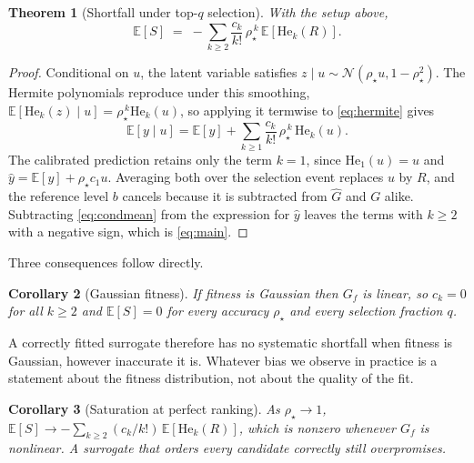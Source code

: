 \documentclass{article}
\theoremstyle{plain}
\newtheorem{theorem}{Theorem}[section]
\newtheorem{corollary}[theorem]{Corollary}
\theoremstyle{definition}
\newcommand{\yhat}{\hat{y}}
\newcommand{\Exp}{\mathbb{E}}
\newcommand{\He}{\mathrm{He}}
\newcommand{\Normal}{\mathcal{N}}
\begin{document}
\begin{theorem}[Shortfall under top-$q$ selection]
\label{thm:main}
With the setup above,
\begin{equation}
\Exp[S] \;=\; -\sum_{k \ge 2} \frac{c_k}{k!}\, \rho_\star^{\,k}\,
\Exp\!\left[\He_k(R)\right].
\label{eq:main}
\end{equation}
\end{theorem}

\begin{proof}
Conditional on $u$, the latent variable satisfies $z \mid u \sim \Normal(\rho_\star u,
1-\rho_\star^2)$. The Hermite polynomials reproduce under this smoothing,
$\Exp[\He_k(z) \mid u] = \rho_\star^{\,k}\He_k(u)$, so applying it termwise to
\cref{eq:hermite} gives
\begin{equation}
\Exp[y \mid u] = \Exp[y] + \sum_{k \ge 1} \frac{c_k}{k!}\,\rho_\star^{\,k}\,\He_k(u).
\label{eq:condmean}
\end{equation}
The calibrated prediction retains only the term $k=1$, since $\He_1(u)=u$ and
$\yhat = \Exp[y] + \rho_\star c_1 u$. Averaging both over the selection event replaces
$u$ by $R$, and the reference level $b$ cancels because it is subtracted from
$\hat{G}$ and $G$ alike. Subtracting \cref{eq:condmean} from the expression for
$\yhat$ leaves the terms with $k \ge 2$ with a negative sign, which is \cref{eq:main}.
\end{proof}

Three consequences follow directly.

\begin{corollary}[Gaussian fitness]
\label{cor:gaussian}
If fitness is Gaussian then $G_{\!f}$ is linear, so $c_k = 0$ for all $k \ge 2$ and
$\Exp[S] = 0$ for every accuracy $\rho_\star$ and every selection fraction $q$.
\end{corollary}

A correctly fitted surrogate therefore has no systematic shortfall when fitness is
Gaussian, however inaccurate it is. Whatever bias we observe in practice is a statement
about the fitness distribution, not about the quality of the fit.

\begin{corollary}[Saturation at perfect ranking]
\label{cor:saturation}
As $\rho_\star \to 1$,
$\Exp[S] \to -\sum_{k \ge 2} (c_k/k!)\,\Exp[\He_k(R)]$,
which is nonzero whenever $G_{\!f}$ is nonlinear. A surrogate that orders every
candidate correctly still overpromises.
\end{corollary}
\end{document}
